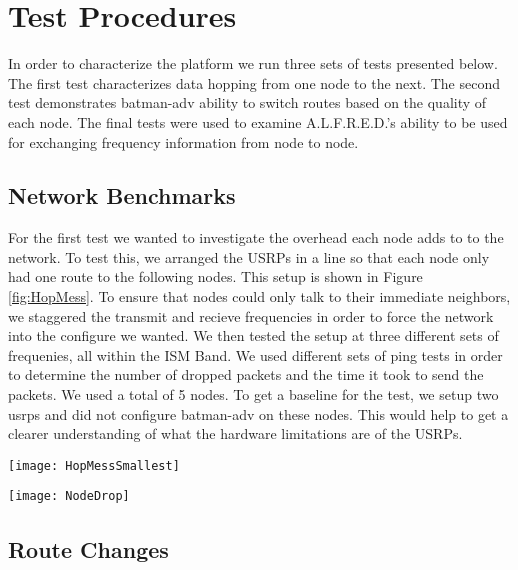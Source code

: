 \section{Test Procedures}

In order to characterize the platform we run three sets of tests presented below. The first test characterizes data hopping from one node to the next. The second test demonstrates batman-adv ability to switch routes based on the quality of each node. The final tests were used to examine A.L.F.R.E.D.'s ability to be used for exchanging frequency information from node to node. 

\subsection{Network Benchmarks}



For the first test we wanted to investigate the overhead each node adds to to the network. To test this, we arranged the USRPs in a line so that each node only had one route to the following nodes. This setup is shown in Figure \ref{fig:HopMess}. To ensure that nodes could only talk to their immediate neighbors, we staggered the transmit and recieve frequencies in order to force the network into the configure we wanted. We then tested the setup at three different sets of frequenies, all within the ISM Band. We used different sets of ping tests in order to determine the number of dropped packets and the time it took to send the packets. We used a total of 5 nodes. To get a baseline for the test, we setup two usrps and did not configure batman-adv on these nodes. This would help to get a clearer understanding of what the hardware limitations are of the USRPs. 

\begin{figure*}
	\centering
	\texttt{[image: HopMessSmallest]}
	\caption{The configuration used for the first set of tests.}
	\label{fig:HopMess}
\end{figure*}

\begin{figure*}
	\centering
	\texttt{[image: NodeDrop]}
	\caption{The configuration used for the second set of tests.}
	\label{fig:NodeDrop}
\end{figure*}

\subsection{Route Changes}

